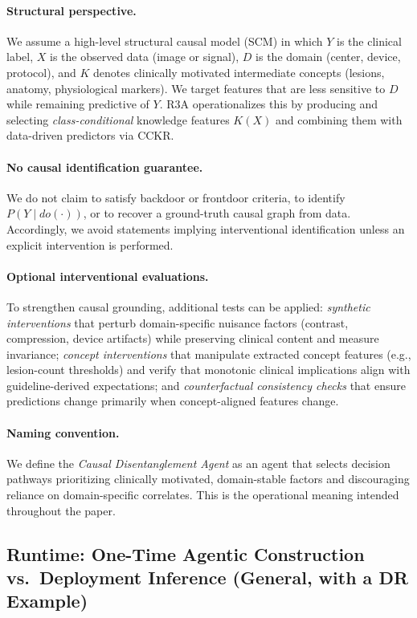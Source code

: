 \documentclass{article}
\begin{document}
\paragraph{Structural perspective.}
We assume a high-level structural causal model (SCM) in which $Y$ is the
clinical label, $X$ is the observed data (image or signal), $D$ is the
domain (center, device, protocol), and $K$ denotes clinically motivated
intermediate concepts (lesions, anatomy, physiological markers). We
target features that are less sensitive to $D$ while remaining predictive
of $Y$. R3A operationalizes this by producing and selecting
\emph{class-conditional} knowledge features $K(X)$ and combining them
with data-driven predictors via CCKR.

\paragraph{No causal identification guarantee.}
We do not claim to satisfy backdoor or frontdoor criteria, to identify
$P(Y \mid do(\cdot))$, or to recover a ground-truth causal graph from
data. Accordingly, we avoid statements implying interventional
identification unless an explicit intervention is performed.

\paragraph{Optional interventional evaluations.}
To strengthen causal grounding, additional tests can be applied:
\emph{synthetic interventions} that perturb domain-specific nuisance
factors (contrast, compression, device artifacts) while preserving
clinical content and measure invariance; \emph{concept interventions}
that manipulate extracted concept features (e.g., lesion-count
thresholds) and verify that monotonic clinical implications align with
guideline-derived expectations; and \emph{counterfactual consistency
checks} that ensure predictions change primarily when concept-aligned
features change.

\paragraph{Naming convention.}
We define the \emph{Causal Disentanglement Agent} as an agent that
selects decision pathways prioritizing clinically motivated,
domain-stable factors and discouraging reliance on domain-specific
correlates. This is the operational meaning intended throughout the
paper.
\subsection{Runtime: One-Time Agentic Construction vs.\ Deployment Inference (General, with a DR Example)}
\label{app:runtime_agentic}
\end{document}
